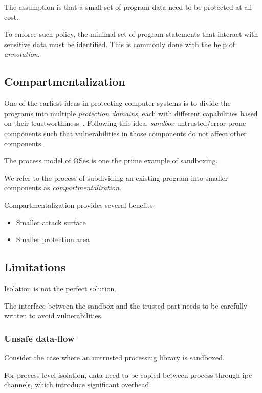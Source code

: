 \documentclass[11pt]{memoir}
\begin{document}
The assumption is that a small set of program data need to be protected at all cost. 

To enforce such policy, the minimal set of program statements that interact with sensitive data must be identified.
This is commonly done with the help of \emph{annotation}.





\subsection{Compartmentalization} One of the earliest ideas in protecting
computer systems is to divide the programs into multiple \emph{protection
domains}, each with different capabilities based on their
trustworthiness~\cite{lampson1974protection}.
Following this idea, \emph{sandbox} untrusted/error-prone components such that
vulnerabilities in those components do not affect other components.


The process model of OSes is one the prime example of sandboxing.

We refer to the process of subdividing an existing program into smaller components as \emph{compartmentalization}.

Compartmentalization provides several benefits.
\begin{itemize}
    \item Smaller attack surface
    \item Smaller protection area
\end{itemize}



\subsection{Limitations}
Isolation is not the perfect solution.

The interface between the sandbox and the trusted part needs to be carefully written to avoid vulnerabilities.


\subsubsection{Unsafe data-flow}
Consider the case where an untrusted processing library is sandboxed.

For process-level isolation, data need to be copied between process through
\gls{ipc} channels, which introduce significant overhead.
\end{document}
